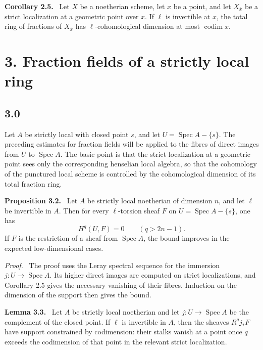 \documentclass[11pt]{article}
\newcommand{\Spec}{\operatorname{Spec}}
\newenvironment{statement}[1]{\par\medskip\noindent\textbf{#1.}\ }{\par\medskip}
\newenvironment{prooftext}{\par\noindent\emph{Proof.}\ }{\par\medskip}
\begin{document}
\begin{statement}{Corollary 2.5}
Let \(X\) be a noetherian scheme, let \(x\) be a point, and let \(X_{\bar x}\) be a strict localization at a geometric point over \(x\). If \(\ell\) is invertible at \(x\), the total ring of fractions of \(X_{\bar x}\) has \(\ell\)-cohomological dimension at most \(\operatorname{codim}x\).
\end{statement}

\section*{3. Fraction fields of a strictly local ring}

\subsection*{3.0}
Let \(A\) be strictly local with closed point \(s\), and let \(U=\Spec A-\{s\}\). The preceding estimates for fraction fields will be applied to the fibres of direct images from \(U\) to \(\Spec A\). The basic point is that the strict localization at a geometric point sees only the corresponding henselian local algebra, so that the cohomology of the punctured local scheme is controlled by the cohomological dimension of its total fraction ring.

\begin{statement}{Proposition 3.2}
Let \(A\) be strictly local noetherian of dimension \(n\), and let \(\ell\) be invertible in \(A\). Then for every \(\ell\)-torsion sheaf \(F\) on \(U=\Spec A-\{s\}\), one has
\[
H^q(U,F)=0\qquad(q>2n-1).
\]
If \(F\) is the restriction of a sheaf from \(\Spec A\), the bound improves in the expected low-dimensional cases.
\end{statement}

\begin{prooftext}
The proof uses the Leray spectral sequence for the immersion \(j:U\to\Spec A\). Its higher direct images are computed on strict localizations, and Corollary 2.5 gives the necessary vanishing of their fibres. Induction on the dimension of the support then gives the bound.
\end{prooftext}

\begin{statement}{Lemma 3.3}
Let \(A\) be strictly local noetherian and let \(j:U\to\Spec A\) be the complement of the closed point. If \(\ell\) is invertible in \(A\), then the sheaves \(R^qj_*F\) have support constrained by codimension: their stalks vanish at a point once \(q\) exceeds the codimension of that point in the relevant strict localization.
\end{statement}
\end{document}
